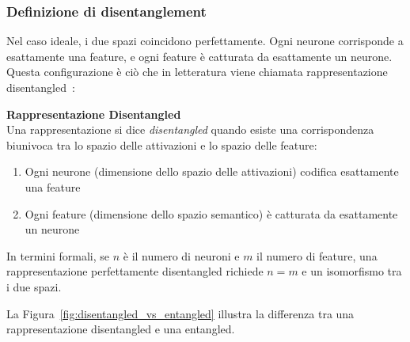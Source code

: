 \subsubsection{Definizione di disentanglement}
Nel caso ideale, i due spazi coincidono perfettamente. Ogni neurone corrisponde a esattamente una feature, e ogni feature è catturata da esattamente un neurone. Questa configurazione è ciò che in letteratura viene chiamata rappresentazione disentangled~\parencite{wang2024disentangledrepresentationlearning}:
\begin{notebox}
\textbf{Rappresentazione Disentangled}\\
Una rappresentazione si dice \textit{disentangled} quando esiste una corrispondenza biunivoca tra lo spazio delle attivazioni e lo spazio delle feature:
\begin{enumerate}
    \item Ogni neurone (dimensione dello spazio delle attivazioni) codifica esattamente una feature
    \item Ogni feature (dimensione dello spazio semantico) è catturata da esattamente un neurone
\end{enumerate}
In termini formali, se $n$ è il numero di neuroni e $m$ il numero di feature, una rappresentazione perfettamente disentangled richiede $n = m$ e un isomorfismo tra i due spazi.
\end{notebox}
La Figura~\ref{fig:disentangled_vs_entangled} illustra la differenza tra una rappresentazione disentangled e una entangled.
